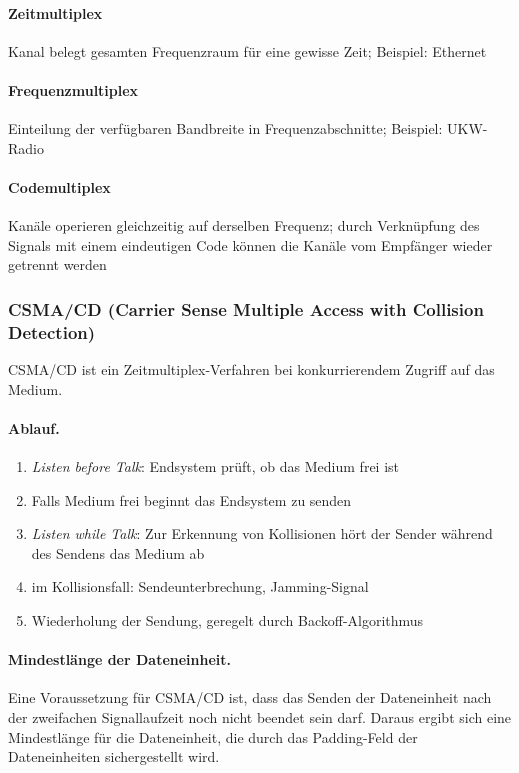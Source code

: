 \documentclass[]{scrartcl}
\begin{document}
\paragraph{Zeitmultiplex} Kanal belegt gesamten Frequenzraum f\"ur eine gewisse Zeit; Beispiel: Ethernet
\paragraph{Frequenzmultiplex} Einteilung der verf\"ugbaren Bandbreite in Frequenzabschnitte; Beispiel: UKW-Radio
\paragraph{Codemultiplex} Kan\"ale operieren gleichzeitig auf derselben Frequenz; durch Verkn\"upfung des Signals mit einem eindeutigen Code k\"onnen die Kan\"ale vom Empf\"anger wieder getrennt werden

\subsubsection{CSMA/CD (Carrier Sense Multiple Access with Collision Detection)}

CSMA/CD ist ein Zeitmultiplex-Verfahren bei konkurrierendem Zugriff auf das Medium.

\paragraph{Ablauf.} 
\begin{enumerate}
\item \emph{Listen before Talk}: Endsystem pr\"uft, ob das Medium frei ist
\item Falls Medium frei beginnt das Endsystem zu senden
\item \emph{Listen while Talk}: Zur Erkennung von Kollisionen h\"ort der Sender w\"ahrend des Sendens das Medium ab
\item im Kollisionsfall: Sendeunterbrechung, Jamming-Signal
\item Wiederholung der Sendung, geregelt durch Backoff-Algorithmus
\end{enumerate}

\paragraph{Mindestl\"ange der Dateneinheit.} Eine Voraussetzung f\"ur CSMA/CD ist, dass das Senden der Dateneinheit nach der zweifachen Signallaufzeit noch nicht beendet sein darf. Daraus ergibt sich eine Mindestl\"ange f\"ur die Dateneinheit, die durch das Padding-Feld der Dateneinheiten sichergestellt wird.
\end{document}
